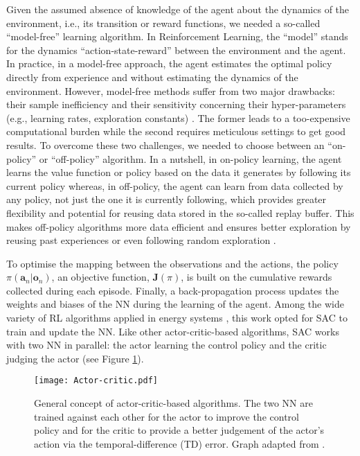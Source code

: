 \documentclass[12pt,letterpaper]{article}
\def\eg{e.g., }
\def\ie{i.e., }
\begin{document}
Given the assumed absence of knowledge of the agent about the dynamics of the environment, \ie its transition or reward functions, we needed a so-called ``model-free'' learning algorithm. In Reinforcement Learning, the ``model'' stands for the dynamics ``action-state-reward'' between the environment and the agent. In practice, in a model-free approach, the agent estimates the optimal policy directly from experience and without estimating the dynamics of the environment. However, model-free methods suffer from two major drawbacks: their sample inefficiency and their sensitivity concerning their hyper-parameters (\eg learning rates, exploration constants) \cite{haarnoja2018soft}. The former leads to a too-expensive computational burden while the second requires meticulous settings to get good results.  To overcome these two challenges, we needed to choose between an ``on-policy'' or ``off-policy'' algorithm. In a nutshell, in on-policy learning, the agent learns the value function or policy based on the data it generates by following its current policy whereas, in off-policy, the agent can learn from data collected by any policy, not just the one it is currently following, which provides greater flexibility and potential for reusing data stored in the so-called replay buffer. This makes off-policy algorithms more data efficient and ensures better exploration by reusing past experiences or even following random exploration \cite{haarnoja2018soft}.

To optimise the mapping between the observations and the actions, the policy $\pi\left(\bm{a}_n | \bm{o}_n\right)$, an objective function, $\bm{J}(\pi)$, is built on the cumulative rewards collected during each episode. Finally, a back-propagation process updates the weights and biases of the \gls*{NN} during the learning of the agent. Among the wide variety of \gls*{RL} algorithms applied in energy systems \cite{perera2021applications}, this work opted for \gls*{SAC} \cite{haarnoja2018soft} to train and update the \gls*{NN}.  Like other actor-critic-based algorithms, \gls*{SAC} works with two \gls*{NN} in parallel: the actor learning the control policy and the critic judging the actor (see Figure \ref{fig:Actor-critic}).

\begin{figure}[!htbp]
\centering
\texttt{[image: Actor-critic.pdf]}
\caption{General concept of actor-critic-based algorithms. The two \gls*{NN} are trained against each other for the actor to improve the control policy and for the critic to provide a better judgement of the actor's action via the temporal-difference (TD) error. Graph adapted from \cite{cao2020reinforcement}.}
\label{fig:Actor-critic}
\end{figure}
\end{document}
